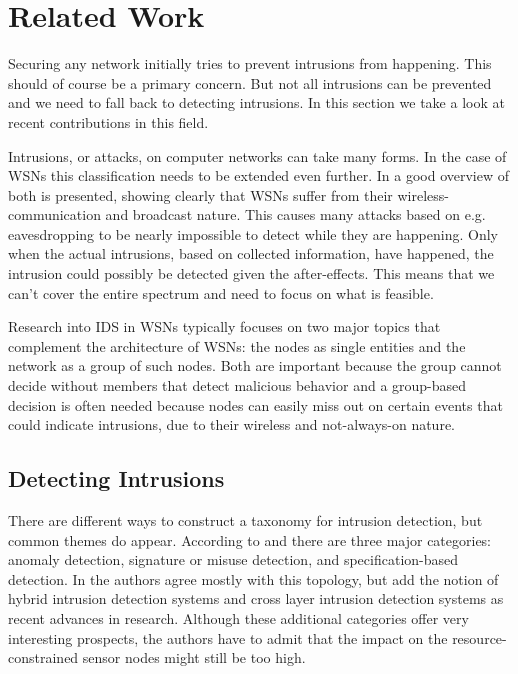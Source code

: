 \documentclass[conference]{IEEEtran}
\begin{document}
\section{Related Work}
\label{section:related}

Securing any network initially tries to prevent intrusions from happening. This
should of course be a primary concern. But not all intrusions can be prevented
and we need to fall back to detecting intrusions. In this section we take a
look at recent contributions in this field.

Intrusions, or attacks, on computer networks can take many forms. In the case
of WSNs this classification needs to be extended even further. In
\cite{padmavathi2009survey} a good overview of both is presented, showing
clearly that WSNs suffer from their wireless-communication and broadcast nature.
This causes many attacks based on e.g. eavesdropping to be nearly impossible to
detect while they are happening. Only when the actual intrusions, based on
collected information, have happened, the intrusion could possibly be detected
given the after-effects. This means that we can't cover the entire spectrum and
need to focus on what is feasible.

Research into IDS in WSNs typically focuses on two major topics that complement
the architecture of WSNs: the nodes as single entities and the network as a
group of such nodes. Both are important because the group cannot decide without
members that detect malicious behavior and a group-based decision is often
needed because nodes can easily miss out on certain events that could indicate
intrusions, due to their wireless and not-always-on nature.

\subsection{Detecting Intrusions}
\label{subsection:detecting}

There are different ways to construct a taxonomy for intrusion detection, but
common themes do appear. According to \cite{mishra2004intrusion} and
\cite{ioannis2007towards} there are three major categories: anomaly detection,
signature or misuse detection, and specification-based detection. In
\cite{alrajeh2013intrusion} the authors agree mostly with this topology, but
add the notion of hybrid intrusion detection systems and cross layer intrusion
detection systems as recent advances in research. Although these additional
categories offer very interesting prospects, the authors have to admit that the
impact on the resource-constrained sensor nodes might still be too high.
\end{document}
